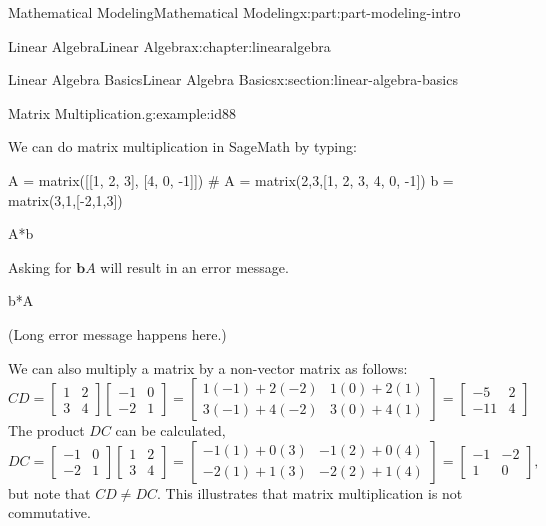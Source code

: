 \documentclass[oneside,10pt,]{book}
\numberwithin{equation}{section}
\begin{document}
\begin{partptx}{Mathematical Modeling}{}{Mathematical Modeling}{}{}{x:part:part-modeling-intro}
\begin{chapterptx}{Linear Algebra}{}{Linear Algebra}{}{}{x:chapter:linearalgebra}
\begin{sectionptx}{Linear Algebra Basics}{}{Linear Algebra Basics}{}{}{x:section:linear-algebra-basics}
\begin{example}{Matrix Multiplication.}{g:example:id88}
\par
We can do matrix multiplication in SageMath by typing:%
\begin{sageinput}
A = matrix([[1, 2, 3], [4, 0, -1]]) # A = matrix(2,3,[1, 2, 3, 4, 0, -1])
b = matrix(3,1,[-2,1,3])

A*b
\end{sageinput}
\begin{sageoutput}
[  9]
[-11]
\end{sageoutput}
Asking for \(\mathbf{b}A\) will result in an error message.%
\begin{sageinput}
b*A
\end{sageinput}
\begin{sageoutput}
(Long error message happens here.)
\end{sageoutput}
We can also multiply a matrix by a non-vector matrix as follows:%
%
\begin{equation*}
CD = \begin{bmatrix}
1 & 2 \\
3 & 4
\end{bmatrix}\begin{bmatrix}
-1 & 0 \\
-2 & 1
\end{bmatrix} = \begin{bmatrix}
1(-1) + 2(-2) & 1(0) + 2(1) \\
3(-1) + 4(-2) & 3(0) + 4(1)
\end{bmatrix} = \begin{bmatrix}
-5 & 2 \\
-11 & 4
\end{bmatrix}
\end{equation*}
The product \(DC\) can be calculated,%
%
\begin{equation*}
DC = \begin{bmatrix}
-1 & 0 \\
-2 & 1
\end{bmatrix}\begin{bmatrix}
1 & 2 \\
3 & 4
\end{bmatrix} = \begin{bmatrix}
-1(1) + 0(3) & -1(2) + 0(4) \\
-2(1) + 1(3) & -2(2) + 1(4)
\end{bmatrix} = \begin{bmatrix}
-1 & -2 \\
1 & 0
\end{bmatrix},
\end{equation*}
but note that \(CD\ne DC\). This illustrates that matrix multiplication is not commutative.%

\end{example}
\end{sectionptx}
\end{chapterptx}
\end{partptx}
\end{document}
